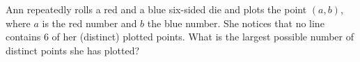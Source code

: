 Ann repeatedly rolls a red and a blue six-sided die and plots the point $(a,b)$, where $a$ is the red number and $b$ the blue number. She notices that no line contains $6$ of her (distinct) plotted points. What is the largest possible number of distinct points she has plotted?

